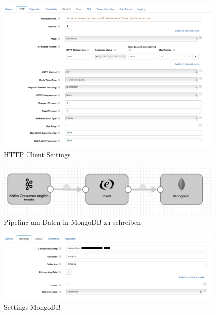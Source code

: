 \begin{figure}[H]
	\centering
		\includegraphics[scale=0.4 ]{images/settings_twitter.png}
	\caption{HTTP Client Settings }
	\label{fig:high_level_architecure}
\end{figure}

\begin{figure}[H]
	\centering
		\includegraphics[scale=0.4 ]{images/tweets_to_mongo.png}
	\caption{Pipeline um Daten in MongoDB zu schreiben}
	\label{fig:high_level_architecure}
\end{figure}

\begin{figure}[H]
	\centering
		\includegraphics[scale=0.4 ]{images/settings_to_mongo_mongo.png}
	\caption{Settings MongoDB}
	\label{fig:high_level_architecure}
\end{figure}

